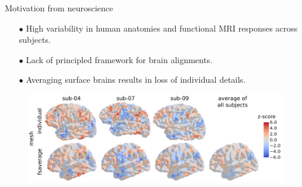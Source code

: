 \documentclass{beamer}
\begin{document}
\begin{frame}{Motivation from neuroscience}
\scriptsize
\begin{itemize}
  \item[$\bullet$] High variability in human anatomies and functional MRI responses across subjects.
  \item[$\bullet$] Lack of principled framework for brain alignments.
  \item[$\bullet$] Averaging surface brains results in loss of individual details.
\end{itemize}
\begin{figure}
  \centering
  \includegraphics[width=1.\linewidth, keepaspectratio=true]{OT_new/intro_variation.pdf}
\end{figure}

\end{frame}
\end{document}
